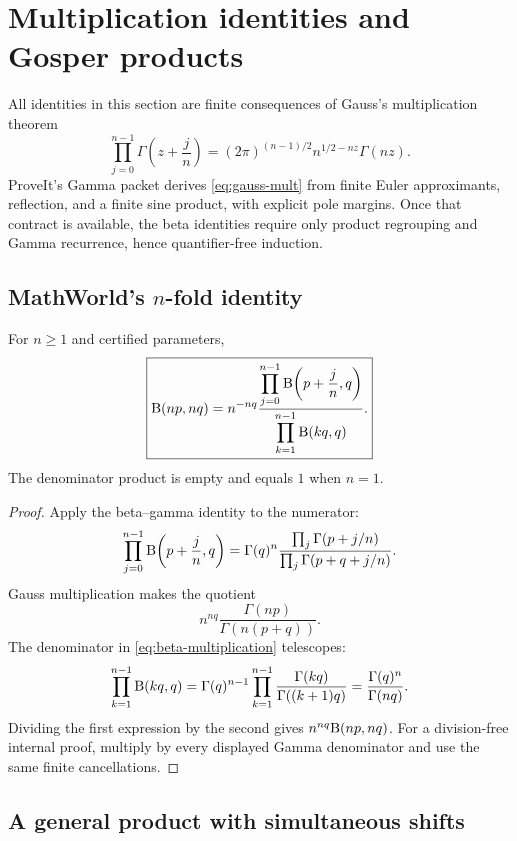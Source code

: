 \section{Multiplication identities and Gosper products}
\label{sec:multiplication}

All identities in this section are finite consequences of Gauss's multiplication theorem
\begin{equation}
 \prod_{j=0}^{n-1}\Gamma\!\left(z+\frac jn\right)
 =(2\pi)^{(n-1)/2}n^{1/2-nz}\Gamma(nz).
 \label{eq:gauss-mult}
\end{equation}
ProveIt's Gamma packet derives \eqref{eq:gauss-mult} from finite Euler approximants, reflection, and a finite sine product, with explicit pole margins.  Once that contract is available, the beta identities require only product regrouping and Gamma recurrence, hence quantifier-free induction.

\subsection{MathWorld's $n$-fold identity}

\begin{theorem}\label{thm:beta-multiplication}
For $n\ge1$ and certified parameters,
\begin{equation}
 \boxed{
 \mathrm B(np,nq)=n^{-nq}
 \frac{\displaystyle\prod_{j=0}^{n-1}
       \mathrm B\!\left(p+\frac jn,q\right)}
      {\displaystyle\prod_{k=1}^{n-1}\mathrm B(kq,q)}.}
 \label{eq:beta-multiplication}
\end{equation}
The denominator product is empty and equals $1$ when $n=1$.
\end{theorem}

\begin{proof}
Apply the beta--gamma identity to the numerator:
\[
 \prod_{j=0}^{n-1}\mathrm B\!\left(p+\frac jn,q\right)
 =\Gamma(q)^n
 \frac{\prod_j\Gamma(p+j/n)}
      {\prod_j\Gamma(p+q+j/n)}.
\]
Gauss multiplication makes the quotient
\[
 n^{nq}\frac{\Gamma(np)}{\Gamma(n(p+q))}.
\]
The denominator in \eqref{eq:beta-multiplication} telescopes:
\[
 \prod_{k=1}^{n-1}\mathrm B(kq,q)
 =\Gamma(q)^{n-1}
   \prod_{k=1}^{n-1}\frac{\Gamma(kq)}{\Gamma((k+1)q)}
 =\frac{\Gamma(q)^n}{\Gamma(nq)}.
\]
Dividing the first expression by the second gives
$n^{nq}\mathrm B(np,nq)$.  For a division-free internal proof, multiply by every displayed Gamma denominator and use the same finite cancellations.
\end{proof}

\subsection{A general product with simultaneous shifts}

